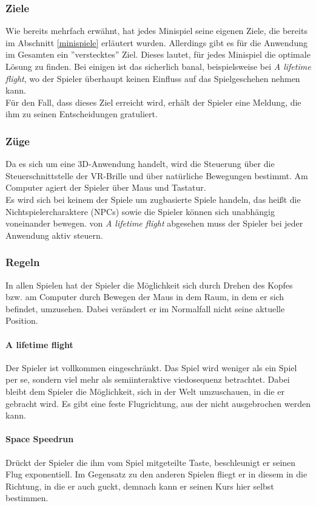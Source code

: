 \documentclass{Ausarbeitung}
\begin{document}
		\subsubsection{Ziele}
		\label{formZiele}
			Wie bereits mehrfach erwähnt, hat jedes Minispiel seine eigenen Ziele, die bereits im Abschnitt \ref{minispiele} erläutert wurden. Allerdings gibt es für die Anwendung im Gesamten ein ''verstecktes'' Ziel. Dieses lautet, für jedes Minispiel die optimale Lösung zu finden. Bei einigen ist das sicherlich banal, beispielsweise bei \textit{A lifetime flight}, wo der Spieler überhaupt keinen Einfluss auf das Spielgeschehen nehmen kann. \\
			Für den Fall, dass dieses Ziel erreicht wird, erhält der Spieler eine Meldung, die ihm zu seinen Entscheidungen gratuliert.
			
		\subsubsection{Züge}
			Da es sich um eine 3D-Anwendung handelt, wird die Steuerung über die Steuerschnittstelle der VR-Brille und über natürliche Bewegungen bestimmt. Am Computer agiert der Spieler über Maus und Tastatur. \\
			Es wird sich bei keinem der Spiele um zugbasierte Spiele handeln, das heißt die Nichtspielercharaktere (NPCs) sowie die Spieler können sich unabhängig voneinander bewegen. von \textit{A lifetime flight} abgesehen muss der Spieler bei jeder Anwendung aktiv steuern.
			
		\subsubsection{Regeln}
			In allen Spielen hat der Spieler die Möglichkeit sich durch Drehen des Kopfes bzw. am Computer durch Bewegen der Maus in dem Raum, in dem er sich befindet, umzusehen. Dabei verändert er im Normalfall nicht seine aktuelle Position.
			\paragraph*{A lifetime flight}
				Der Spieler ist vollkommen eingeschränkt. Das Spiel wird weniger als ein Spiel per se, sondern viel mehr als semiinteraktive viedosequenz betrachtet. Dabei bleibt dem Spieler die Möglichkeit, sich in der Welt umzuschauen, in die er gebracht wird. Es gibt eine feste Flugrichtung, aus der nicht ausgebrochen werden kann.
				
			\paragraph*{Space Speedrun}
				Drückt der Spieler die ihm vom Spiel mitgeteilte Taste, beschleunigt er seinen Flug exponentiell. Im Gegensatz zu den anderen Spielen fliegt er in diesem in die Richtung, in die er auch guckt, demnach kann er seinen Kurs hier selbst bestimmen.
			
\end{document}
